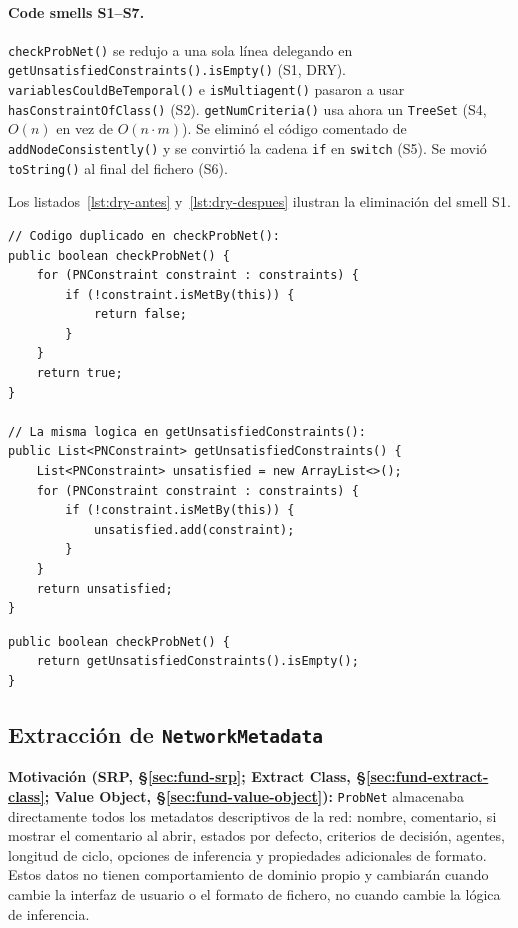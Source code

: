 \documentclass[11pt,a4paper]{article}
\newcommand{\code}[1]{\texttt{#1}}
\begin{document}
\paragraph{Code smells S1--S7.}
\code{checkProbNet()} se redujo a una sola línea delegando en
\code{getUnsatisfiedConstraints().isEmpty()} (S1, DRY).
\code{variablesCouldBeTemporal()} e \code{isMultiagent()} pasaron a usar
\code{hasConstraintOfClass()} (S2).  \code{getNumCriteria()} usa ahora
un \code{TreeSet} (S4, $O(n)$ en vez de $O(n \cdot m)$).  Se eliminó el
código comentado de \code{addNodeConsistently()} y se convirtió la cadena
\code{if} en \code{switch} (S5).  Se movió \code{toString()} al final del
fichero (S6).

Los listados~\ref{lst:dry-antes} y~\ref{lst:dry-despues} ilustran la
eliminación del smell S1.

\begin{lstlisting}[caption={Antes: dos métodos con la misma lógica (violación DRY).},
                   label=lst:dry-antes]
// Codigo duplicado en checkProbNet():
public boolean checkProbNet() {
    for (PNConstraint constraint : constraints) {
        if (!constraint.isMetBy(this)) {
            return false;
        }
    }
    return true;
}

// La misma logica en getUnsatisfiedConstraints():
public List<PNConstraint> getUnsatisfiedConstraints() {
    List<PNConstraint> unsatisfied = new ArrayList<>();
    for (PNConstraint constraint : constraints) {
        if (!constraint.isMetBy(this)) {
            unsatisfied.add(constraint);
        }
    }
    return unsatisfied;
}
\end{lstlisting}

\begin{lstlisting}[caption={Después: \texttt{checkProbNet()} delega en \texttt{getUnsatisfiedConstraints()} (DRY).},
                   label=lst:dry-despues]
public boolean checkProbNet() {
    return getUnsatisfiedConstraints().isEmpty();
}
\end{lstlisting}

\subsection{Extracción de \texttt{NetworkMetadata}}
\label{sec:metadata}

\textbf{Motivación (SRP, §\ref{sec:fund-srp}; Extract Class,
§\ref{sec:fund-extract-class}; Value Object, §\ref{sec:fund-value-object}):}
\code{ProbNet} almacenaba directamente todos los metadatos descriptivos
de la red: nombre, comentario, si mostrar el comentario al abrir, estados
por defecto, criterios de decisión, agentes, longitud de ciclo, opciones
de inferencia y propiedades adicionales de formato.  Estos datos no tienen
comportamiento de dominio propio y cambiarán cuando cambie la interfaz de
usuario o el formato de fichero, no cuando cambie la lógica de inferencia.
\end{document}
